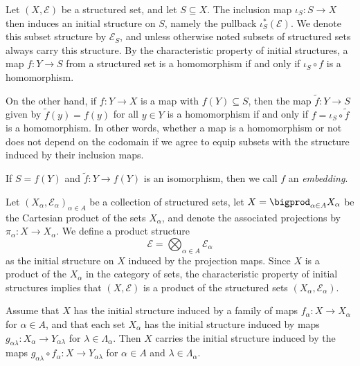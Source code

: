 \documentclass[article, a4paper, 11pt, oneside]{memoir}
\numberwithin{equation}{chapter}
\newcommand{\calE}{\mathcal{E}}
\begin{document}
\begin{examplebreak}[Subsets]
    \label{ex:subset_structure}
    Let $(X,\calE)$ be a structured set, and let $S \subseteq X$. The inclusion map $\iota_S \colon S \to X$ then induces an initial structure on $S$, namely the pullback $\iota_S^*(\calE)$. We denote this subset structure by $\calE_S$, and unless otherwise noted subsets of structured sets always carry this structure. By the characteristic property of initial structures, a map $f \colon Y \to S$ from a structured set is a homomorphism if and only if $\iota_S \circ f$ is a homomorphism.

    On the other hand, if $f \colon Y \to X$ is a map with $f(Y) \subseteq S$, then the map $\tilde f \colon Y \to S$ given by $\tilde f(y) = f(y)$ for all $y \in Y$ is a homomorphism if and only if $f = \iota_S \circ \tilde f$ is a homomorphism. In other words, whether a map is a homomorphism or not does not depend on the codomain if we agree to equip subsets with the structure induced by their inclusion maps.

    If $S = f(Y)$ and $\tilde f \colon Y \to f(Y)$ is an isomorphism, then we call $f$ an \emph{embedding}.
\end{examplebreak}

\begin{examplebreak}[Products]
    \label{ex:product_structure}
    Let $(X_\alpha, \calE_\alpha)_{\alpha \in A}$ be a collection of structured sets, let $X = \bigprod_{\alpha \in A} X_\alpha$ be the Cartesian product of the sets $X_\alpha$, and denote the associated projections by $\pi_\alpha \colon X \to X_\alpha$. We define a product structure
    \begin{equation*}
        \calE = \bigotimes_{\alpha \in A} \calE_\alpha
    \end{equation*}
    as the initial structure on $X$ induced by the projection maps. Since $X$ is a product of the $X_\alpha$ in the category of sets, the characteristic property of initial structures implies that $(X,\calE)$ is a product of the structured sets $(X_\alpha,\calE_\alpha)$.
\end{examplebreak}


\begin{proposition}
    Assume that $X$ has the initial structure induced by a family of maps $f_\alpha \colon X \to X_\alpha$ for $\alpha \in A$, and that each set $X_\alpha$ has the initial structure induced by maps $g_{\alpha\lambda} \colon X_\alpha \to Y_{\alpha\lambda}$ for $\lambda \in \Lambda_\alpha$. Then $X$ carries the initial structure induced by the maps $g_{\alpha\lambda} \circ f_\alpha \colon X \to Y_{\alpha\lambda}$ for $\alpha \in A$ and $\lambda \in \Lambda_\alpha$.
\end{proposition}
\end{document}
